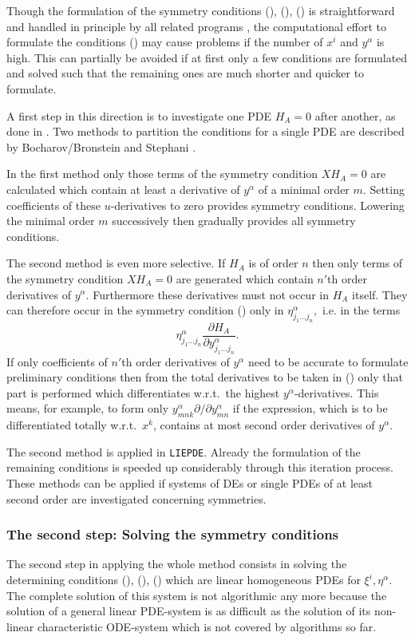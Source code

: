 Though the formulation of the symmetry conditions (),
(), ()
is straightforward and handled in principle by all related
programs \cite{Hereman:95}, the computational effort to formulate
the conditions () may cause problems if
the number of $x^i$ and $y^\alpha$ is high.  This can
partially be avoided if at first only a few conditions are formulated
and solved such that the remaining ones are much shorter and quicker to
formulate.

A first step in this direction is to investigate one PDE $H_A = 0$
after another, as done in \cite{Champagne:91}.  Two methods to partition the
conditions for a single PDE are described by Bocharov/Bronstein
\cite{Bocharov:89} and Stephani \cite{Stephani:89}.

In the first method only those terms of the symmetry condition
$X H_A = 0$ are calculated which contain
at least a derivative of $y^\alpha$ of a minimal order $m.$
Setting coefficients
of these $u$-derivatives to zero provides symmetry conditions. Lowering the
minimal order $m$ successively then gradually provides all symmetry conditions.

The second method is even more selective. If $H_A$ is of order $n$
then only terms of the symmetry condition $X H_A = 0$ are generated which
contain $n'$th order derivatives of $y^\alpha.$ Furthermore these derivatives
must not occur in $H_A$ itself. They can therefore occur
in the symmetry condition
() only in
$\eta^\alpha_{j_1\ldots j_n},$ i.e. in the terms
\[\eta^\alpha_{j_1\ldots j_n}
\frac{\partial H_A}{\partial y^\alpha_{j_1\ldots j_n}}. \]
If only coefficients of $n'$th order derivatives of $y^\alpha$ need to be
accurate to formulate preliminary conditions
then from the total derivatives to be taken in
() only that part is performed which differentiates w.r.t.\ the
highest $y^\alpha$-derivatives.
This means, for example, to form only
$y^\alpha_{mnk} \partial/\partial y^\alpha_{mn} $
if the expression, which is to be differentiated totally w.r.t.\ $x^k$,
contains at most second order derivatives of $y^\alpha.$

The second method is applied in \texttt{LIEPDE}.
Already the formulation of the remaining conditions is speeded up
considerably through this iteration process. These methods can be applied if
systems of DEs or single PDEs of at least second order are investigated
concerning symmetries.
\subsubsection{The second step: Solving the symmetry conditions}
The second step in applying the whole method consists in solving the
determining conditions (), (), ()
which are linear homogeneous PDEs for $\xi^i, \eta^\alpha$. The
complete solution of this system is not algorithmic any more because the
solution of a general linear PDE-system is as difficult as the solution of
its non-linear characteristic ODE-system which is not covered by algorithms
so far.

